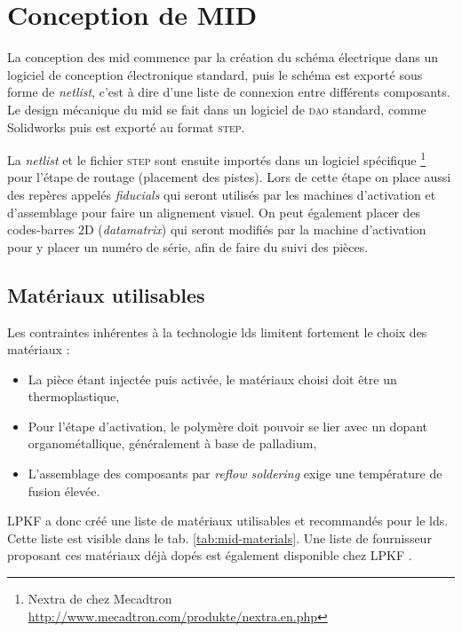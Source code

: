 
\section{Conception de MID}
La conception des \gls{mid} commence par la création du schéma électrique dans un logiciel de conception électronique standard, puis le schéma est exporté sous forme de \emph{netlist}, c'est à dire d'une liste de connexion entre différents composants.
Le design mécanique du \gls{mid} se fait dans un logiciel de \textsc{dao} standard, comme Solidworks puis est exporté au format \textsc{step}.

La \emph{netlist} et le fichier \textsc{step} sont ensuite importés dans un logiciel spécifique \footnote{Nextra de chez Mecadtron \url{http://www.mecadtron.com/produkte/nextra.en.php}} pour l'étape de routage (placement des pistes).
Lors de cette étape on place aussi des repères appelés \emph{fiducials} qui seront utilisés par les machines d'activation et d'assemblage pour faire un alignement visuel.
On peut également placer des codes-barres 2D (\emph{datamatrix}) qui seront modifiés par la machine d'activation pour y placer un numéro de série, afin de faire du suivi des pièces.

\subsection{Matériaux utilisables}
Les contraintes inhérentes à la technologie \gls{lds} limitent fortement le choix des matériaux :
\begin{itemize}
    \item La pièce étant injectée puis activée, le matériaux choisi doit être un thermoplastique,
    \item Pour l'étape d'activation, le polymère doit pouvoir se lier avec un dopant organométallique, généralement à base de palladium,
    \item L'assemblage des composants par \textit{reflow soldering} exige une température de fusion élevée.
\end{itemize}

LPKF a donc créé une liste de matériaux utilisables et recommandés pour le \gls{lds}.
Cette liste est visible dans le tab. \ref{tab:mid-materials}.
Une liste de fournisseur proposant ces matériaux déjà dopés est également disponible chez LPKF \cite{mid-design-rules}.

